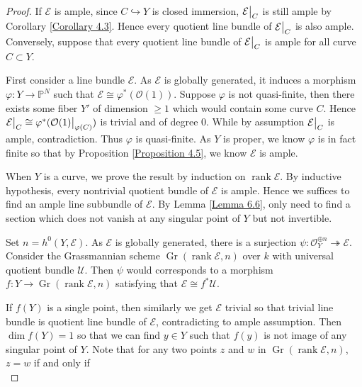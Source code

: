 \documentclass{ctexart}
\newcommand{\rank}{\operatorname{rank}}
\newcommand{\grassmannianscheme}[2]{\operatorname{Gr}(#1, #2)}
\begin{document}
\begin{proof}
    If $\mathcal{E}$ is ample, since $C \hookrightarrow Y$ is closed immersion, $\mathcal{E}\big{|}_{C}$ is still ample by Corollary \ref{Corollary 4.3}.
    Hence every quotient line bundle of $\mathcal{E}\big{|}_{C}$ is also ample.
    Conversely, suppose that every quotient line bundle of $\mathcal{E}\big{|}_{C}$ is ample for all curve $C \subset Y$.
    \par
    First consider a line bundle $\mathcal{E}$.
    As $\mathcal{E}$ is globally generated, it induces a morphism $\varphi: Y \rightarrow \mathbb{P}^{N}$ such that $\mathcal{E} \cong \varphi^{\ast}(\mathcal{O}(1))$.
    Suppose $\varphi$ is not quasi-finite, then there exists some fiber $Y'$ of dimension $\ge 1$ which would contain some curve $C$.
    Hence $\mathcal{E}\big{|}_{C} \cong \varphi^{\ast}(\mathcal{O}(1)\big{|}_{\varphi(C)})$ is trivial and of degree $0$.
    While by assumption $\mathcal{E}\big{|}_{C}$ is ample, contradiction.
    Thus $\varphi$ is quasi-finite.
    As $Y$ is proper, we know $\varphi$ is in fact finite so that by Proposition \ref{Proposition 4.5}, we know $\mathcal{E}$ is ample.
    \par
    When $Y$ is a curve, we prove the result by induction on $\rank \mathcal{E}$.
    By inductive hypothesis, every nontrivial quotient bundle of $\mathcal{E}$ is ample.
    Hence we suffices to find an ample line subbundle of $\mathcal{E}$.
    By Lemma \ref{Lemma 6.6}, only need to find a section which does not vanish at any singular point of $Y$ but not invertible.
    \par
    Set $n = h^{0}(Y, \mathcal{E})$.
    As $\mathcal{E}$ is globally generated, there is a surjection $\psi: \mathcal{O}_{Y}^{\oplus n} \twoheadrightarrow \mathcal{E}$.
    Consider the Grassmannian scheme $\grassmannianscheme{\rank \mathcal{E}}{n}$ over $k$ with universal quotient bundle $\mathcal{U}$.
    Then $\psi$ would corresponds to a morphism $f: Y \rightarrow \grassmannianscheme{\rank \mathcal{E}}{n}$ satisfying that $\mathcal{E} \cong f^{\ast}\mathcal{U}$.
    \par
    If $f(Y)$ is a single point, then similarly we get $\mathcal{E}$ trivial so that trivial line bundle is quotient line bundle of $\mathcal{E}$, contradicting to ample assumption.
    Then $\dim f(Y) = 1$ so that we can find $y\in Y$ such that $f(y)$ is not image of any singular point of $Y$.
    Note that for any two points $z$ and $w$ in $\grassmannianscheme{\rank \mathcal{E}}{n}$, $z = w$ if and only if 
    \begin{equation}

\end{equation}
\end{proof}
\end{document}
